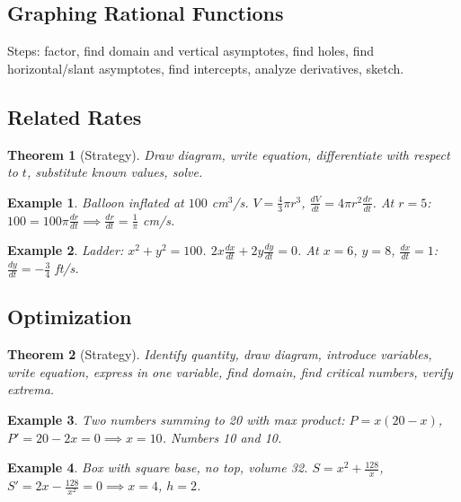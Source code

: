 \documentclass[11pt,a4paper]{article}
\newtheorem{example}{Example}
\newtheorem{theorem}{Theorem}
\begin{document}
\subsection{Graphing Rational Functions}
Steps: factor, find domain and vertical asymptotes, find holes, find horizontal/slant asymptotes, find intercepts, analyze derivatives, sketch.
\subsection{Related Rates}
\begin{theorem}[Strategy]
Draw diagram, write equation, differentiate with respect to $t$, substitute known values, solve.
\end{theorem}
\begin{example}
Balloon inflated at $100$ cm$^3$/s. $V = \frac{4}{3}\pi r^3$, $\frac{dV}{dt} = 4\pi r^2 \frac{dr}{dt}$. At $r=5$: $100 = 100\pi \frac{dr}{dt} \implies \frac{dr}{dt} = \frac{1}{\pi}$ cm/s.
\end{example}
\begin{example}
Ladder: $x^2 + y^2 = 100$. $2x\frac{dx}{dt} + 2y\frac{dy}{dt} = 0$. At $x=6$, $y=8$, $\frac{dx}{dt}=1$: $\frac{dy}{dt} = -\frac{3}{4}$ ft/s.
\end{example}
\subsection{Optimization}
\begin{theorem}[Strategy]
Identify quantity, draw diagram, introduce variables, write equation, express in one variable, find domain, find critical numbers, verify extrema.
\end{theorem}
\begin{example}
Two numbers summing to 20 with max product: $P = x(20-x)$, $P' = 20-2x = 0 \implies x=10$. Numbers 10 and 10.
\end{example}
\begin{example}
Box with square base, no top, volume 32. $S = x^2 + \frac{128}{x}$, $S' = 2x - \frac{128}{x^2} = 0 \implies x = 4$, $h = 2$.
\end{example}
\end{document}
